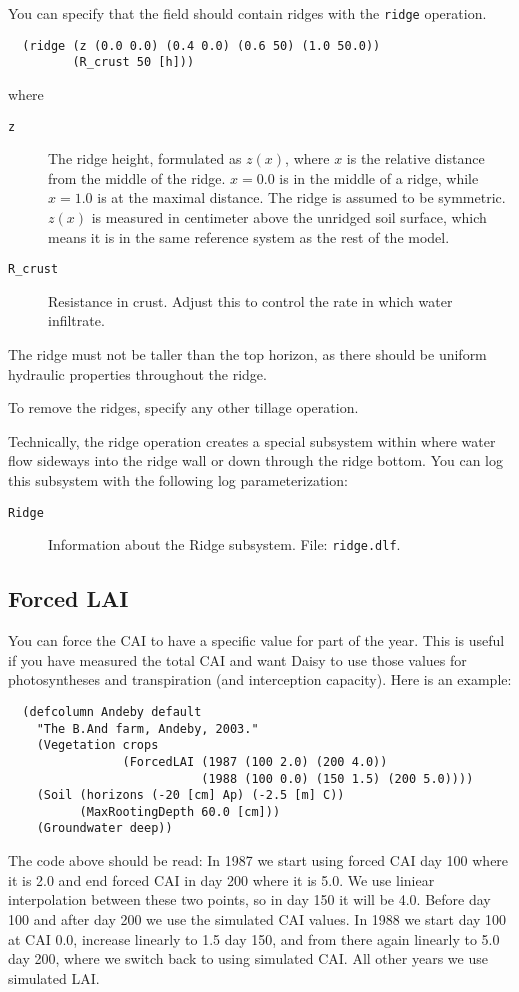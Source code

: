 \documentclass[a4paper,11pt]{article}
\begin{document}
You can specify that the field should contain ridges with the
\texttt{ridge} operation.
\begin{verbatim}
  (ridge (z (0.0 0.0) (0.4 0.0) (0.6 50) (1.0 50.0))
         (R_crust 50 [h]))
\end{verbatim}
where
\begin{description}
\item[\texttt{z}] The ridge height, formulated as $z (x)$, where $x$
  is the relative distance from the middle of the ridge.  $x = 0.0$ is
  in the middle of a ridge, while $x = 1.0$ is at the maximal
  distance.  The ridge is assumed to be symmetric.  $z (x)$ is
  measured in centimeter above the unridged soil surface, which means
  it is in the same reference system as the rest of the model.
\item[\texttt{R\_crust}] Resistance in crust.  Adjust this to control
  the rate in which water infiltrate.
\end{description}
The ridge must not be taller than the top horizon, as there should be
uniform hydraulic properties throughout the ridge.

To remove the ridges, specify any other tillage operation.

Technically, the ridge operation creates a special subsystem within
\daisy{} where water flow sideways into the ridge wall or down through
the ridge bottom.  You can log this subsystem with the following log
parameterization:
\begin{description}
\item[\texttt{Ridge}] Information about the Ridge subsystem.  File:
  \texttt{ridge.dlf}.
\end{description}

\subsection{Forced LAI}
\label{sec:forced-lai}

You can force the CAI to have a specific value for part of the year.
This is useful if you have measured the total CAI and want Daisy to
use those values for photosyntheses and transpiration (and
interception capacity).  Here is an example:
\begin{verbatim}
  (defcolumn Andeby default
    "The B.And farm, Andeby, 2003."
    (Vegetation crops
                (ForcedLAI (1987 (100 2.0) (200 4.0))
                           (1988 (100 0.0) (150 1.5) (200 5.0))))
    (Soil (horizons (-20 [cm] Ap) (-2.5 [m] C))
          (MaxRootingDepth 60.0 [cm]))
    (Groundwater deep))
\end{verbatim}
The code above should be read: In 1987 we start using forced CAI day
100 where it is 2.0 and end forced CAI in day 200 where it is 5.0.  We
use liniear interpolation between these two points, so in day 150 it
will be 4.0.  Before day 100 and after day 200 we use the simulated
CAI values.  In 1988 we start day 100 at CAI 0.0, increase linearly to
1.5 day 150, and from there again linearly to 5.0 day 200, where we
switch back to using simulated CAI\@.  All other years we use simulated
LAI.
\end{document}
